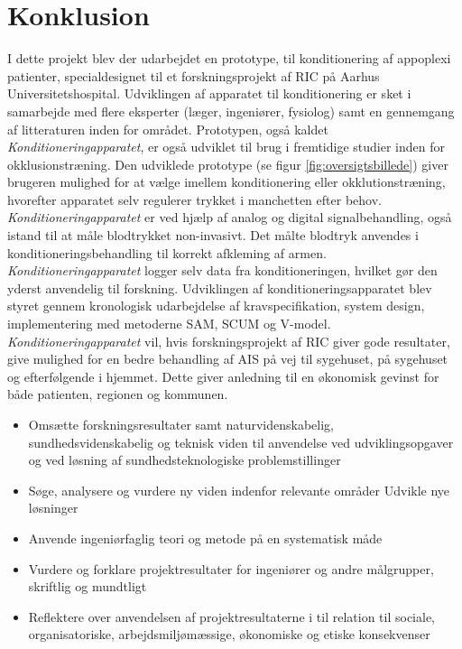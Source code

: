 \chapter{Konklusion}
I dette projekt blev der udarbejdet en prototype, til konditionering af appoplexi patienter, specialdesignet til et forskningsprojekt af RIC på Aarhus Universitetshospital. Udviklingen af apparatet til konditionering er sket i samarbejde med flere eksperter (læger, ingeniører, fysiolog) samt en gennemgang af litteraturen inden for området. Prototypen, også kaldet \textit{Konditioneringapparatet}, er også udviklet til brug i fremtidige studier inden for okklusionstræning.
Den udviklede prototype (se figur \ref{fig:oversigtsbillede}) giver brugeren mulighed for at vælge imellem konditionering eller okklutionstræning, hvorefter apparatet selv regulerer trykket i manchetten efter behov. \textit{Konditioneringapparatet} er ved hjælp af analog og digital signalbehandling, også istand til at måle blodtrykket non-invasivt. Det målte blodtryk anvendes i konditioneringsbehandling til korrekt afkleming af armen. \textit{Konditioneringapparatet} logger selv data fra konditioneringen, hvilket gør den yderst anvendelig til forskning. 
Udviklingen af konditioneringsapparatet blev styret gennem kronologisk udarbejdelse af kravspecifikation, system design, implementering med metoderne SAM, SCUM og V-model.
\textit{Konditioneringapparatet} vil, hvis forskningsprojekt af RIC giver gode resultater, give mulighed for en bedre behandling af AIS på vej til sygehuset, på sygehuset og efterfølgende i hjemmet. Dette giver anledning til en økonomisk gevinst for både patienten, regionen og kommunen.


\begin{itemize}
	\item Omsætte forskningsresultater samt naturvidenskabelig, sundhedsvidenskabelig og teknisk viden til anvendelse ved udviklingsopgaver og ved løsning af sundhedsteknologiske problemstillinger
	\item Søge, analysere og vurdere ny viden indenfor relevante områder
	Udvikle nye løsninger
	\item Anvende ingeniørfaglig teori og metode på en systematisk måde
	\item Vurdere og forklare projektresultater for ingeniører og andre målgrupper, skriftlig og mundtligt
	
	\item Reflektere over anvendelsen af projektresultaterne i til relation til sociale, organisatoriske, arbejdsmiljømæssige, økonomiske og etiske konsekvenser
	
\end{itemize}




